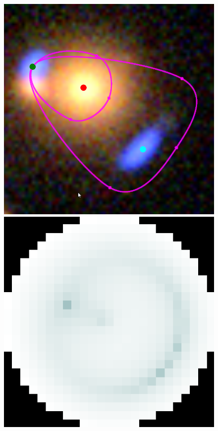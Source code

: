 \begin{figure}
  \centering
  \includegraphics[width=\myplotswidth]{fig/006975_input}
  \includegraphics[width=\myplotswidth]{fig/006975_arr_time} \\

\end{figure}
